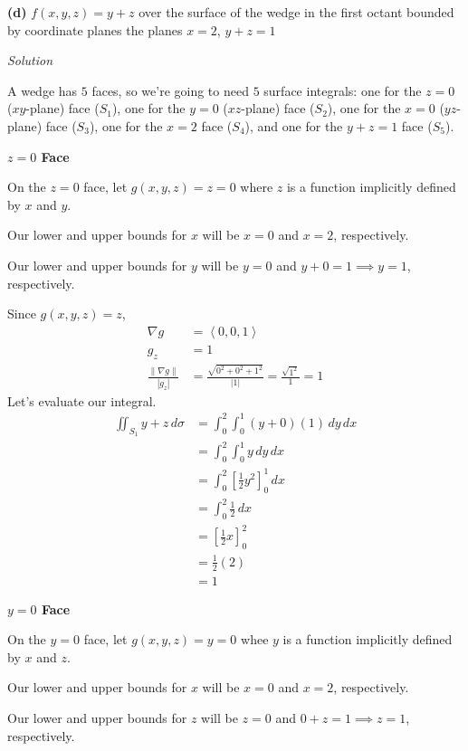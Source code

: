 \documentclass{article}
\newcommand{\lrp}[1]{\left( #1 \right)}
\newcommand{\lra}[1]{\left\langle #1 \right\rangle}
\newcommand{\lrb}[1]{\left[ #1 \right]}
\newcommand{\norm}[1]{\left\lVert #1 \right\rVert}
\newcommand{\Solution}{\textit{Solution}}
\begin{document}
{}\textbf{(d)} $f(x,y,z)=y+z$ over the surface of the wedge in the first octant bounded by coordinate planes the planes $x=2$, $y+z=1$

\Solution

A wedge has $5$ faces, so we're going to need $5$ surface integrals: one for the $z=0$ ($xy$-plane) face ($S_1$), one for the $y=0$ ($xz$-plane) face ($S_2$), one for the $x=0$ ($yz$-plane) face ($S_3$),  one for the $x=2$ face ($S_4$), and one for the $y+z=1$ face ($S_5$).

{}\textbf{$z=0$ Face}

On the $z=0$ face, let $g(x,y,z)=z=0$ where $z$ is a function implicitly defined by $x$ and $y$.

Our lower and upper bounds for $x$ will be $x=0$ and $x=2$, respectively.

Our lower and upper bounds for $y$ will be $y=0$ and $y+0=1\implies y=1$, respectively.

Since $g(x,y,z)=z$,
\begin{align*}
    \nabla g&=\lra{0,0,1}\\
    g_z&=1\\
    \frac{\norm{\nabla g}}{\left|g_z\right|}&=\frac{\sqrt{0^2+0^2+1^2}}{\left|1\right|}=\frac{\sqrt{1^2}}{1}=1
\end{align*}
Let's evaluate our integral.
\begin{align*}
  \iint_{S_1} y+z\,d\sigma &= \int_0^2\int_0^1 \lrp{y+0}\lrp{1}\,dy\,dx\\
    &=\int_0^2 \int_0^1 y\,dy\,dx\\
    &=\int_0^2 \lrb{\frac{1}{2}y^2}_0^1\,dx\\
    &=\int_0^2 \frac{1}{2}\,dx\\
    &=\lrb{\frac{1}{2}x}_0^2\\
    &=\frac{1}{2}(2)\\
    &=1
\end{align*}

{}\textbf{$y=0$ Face}

On the $y=0$ face, let $g(x,y,z)=y=0$ whee $y$ is a function implicitly defined by $x$ and $z$.

Our lower and upper bounds for $x$ will be $x=0$ and $x=2$, respectively.

Our lower and upper bounds for $z$ will be $z=0$ and $0+z=1\implies z=1$, respectively.
\end{document}
